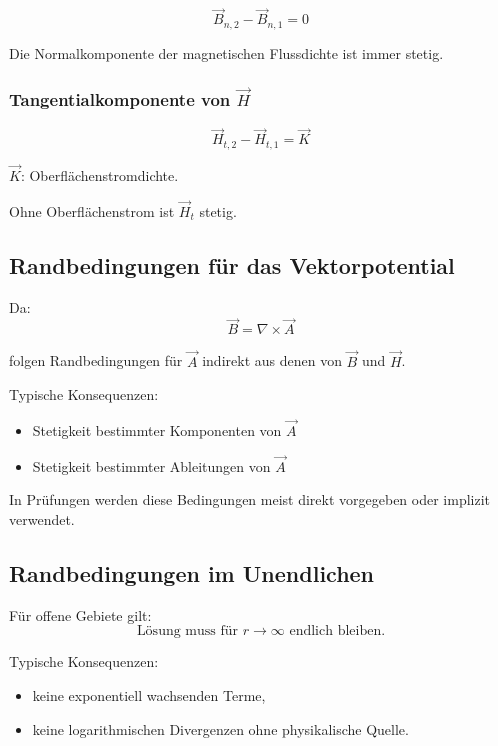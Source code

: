 \documentclass[a4paper]{article}
\newcommand{\Hf}{\vec H}
\newcommand{\B}{\vec B}
\newcommand{\A}{\vec A}
\begin{document}
\[
\B_{n,2} - \B_{n,1} = 0
\]

Die Normalkomponente der magnetischen Flussdichte ist immer stetig.

\subsubsection{Tangentialkomponente von $\Hf$}

\[
\Hf_{t,2} - \Hf_{t,1} = \vec K
\]

$\vec K$: Oberflächenstromdichte.

\begin{checkitem}
Ohne Oberflächenstrom ist $\Hf_t$ stetig.
\end{checkitem}

\subsection{Randbedingungen für das Vektorpotential}

Da:
\[
\B = \nabla \times \A
\]

folgen Randbedingungen für $\A$ indirekt aus denen von $\B$ und $\Hf$.

Typische Konsequenzen:
\begin{itemize}
  \item Stetigkeit bestimmter Komponenten von $\A$
  \item Stetigkeit bestimmter Ableitungen von $\A$
\end{itemize}

\begin{merke}
In Prüfungen werden diese Bedingungen meist direkt vorgegeben oder implizit verwendet.
\end{merke}

\subsection{Randbedingungen im Unendlichen}

Für offene Gebiete gilt:
\[
\text{Lösung muss für } r \to \infty \text{ endlich bleiben}.
\]

Typische Konsequenzen:
\begin{itemize}
  \item keine exponentiell wachsenden Terme,
  \item keine logarithmischen Divergenzen ohne physikalische Quelle.
\end{itemize}
\end{document}
